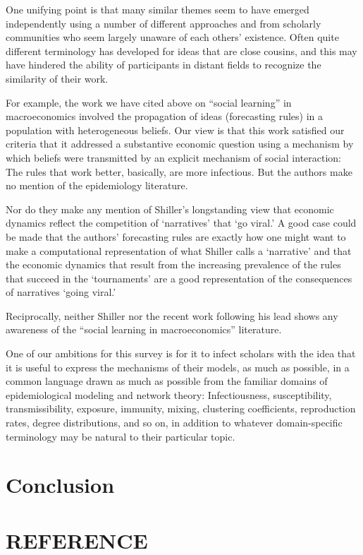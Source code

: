 One unifying point is that many similar themes seem to have emerged independently using a number of different approaches and from scholarly communities who seem largely unaware of each others' existence.  Often quite different terminology has developed for ideas that are close cousins, and this may have hindered the ability of participants in distant fields to recognize the similarity of their work.

For example, the work we have cited above on ``social learning'' in macroeconomics involved the propagation of ideas (forecasting rules) in a population with heterogeneous beliefs.  Our view is that this work satisfied our criteria that it addressed a substantive economic question using a mechanism by which beliefs were transmitted by an explicit mechanism of social interaction: The rules that work better, basically, are more infectious.  But the authors make no mention of the epidemiology literature.

Nor do they make any mention of Shiller's longstanding view that economic dynamics reflect the competition of `narratives' that `go viral.'  A good case could be made that the authors' forecasting rules are exactly how one might want to make a computational representation of what Shiller calls a `narrative' and that the economic dynamics that result from the increasing prevalence of the rules that succeed in the `tournaments' are a good representation of the consequences of narratives `going viral.'

Reciprocally, neither Shiller nor the recent work following his lead shows any awareness of the ``social learning in macroeconomics'' literature.

One of our ambitions for this survey is for it to infect scholars with the idea that it is useful to express the mechanisms of their models, as much as possible, in a common language drawn as much as possible from the familiar domains of epidemiological modeling and network theory:  Infectiousness, susceptibility, transmissibility, exposure, immunity, mixing, clustering coefficients, reproduction rates, degree distributions, and so on, in addition to whatever domain-specific terminology may be natural to their particular topic.

\section{Conclusion}

\newpage



\section*{REFERENCE}

%
% 



%
